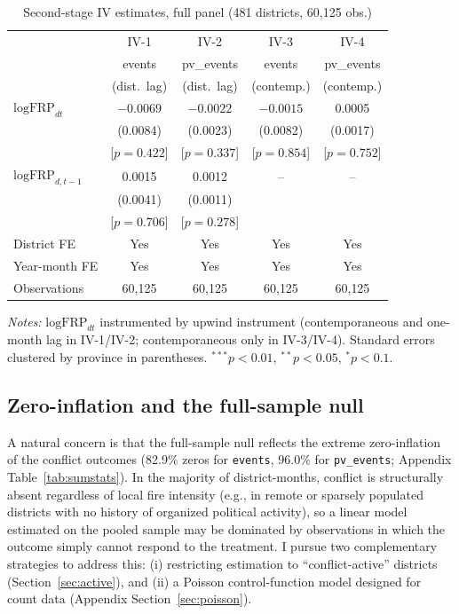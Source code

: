 \documentclass[12pt]{article}
\begin{document}
\begin{table}[H]
\centering
\caption{Second-stage IV estimates, full panel (481 districts, 60{,}125 obs.)}
\label{tab:mainiv}
\begin{tabular}{lcccc}
\toprule
 & IV-1 & IV-2 & IV-3 & IV-4 \\
 & events & pv\_events & events & pv\_events \\
 & (dist.\ lag) & (dist.\ lag) & (contemp.) & (contemp.) \\
\midrule
$\text{logFRP}_{dt}$       & $-0.0069$ & $-0.0022$ & $-0.0015$ & 0.0005  \\
                            & (0.0084) & (0.0023) & (0.0082) & (0.0017) \\
                            & [$p=0.422$] & [$p=0.337$] & [$p=0.854$] & [$p=0.752$] \\
$\text{logFRP}_{d,t-1}$    & 0.0015  & 0.0012   &  --     &  --     \\
                            & (0.0041) & (0.0011) &         &         \\
                            & [$p=0.706$] & [$p=0.278$] &      &       \\
\midrule
District FE        & Yes & Yes & Yes & Yes \\
Year-month FE      & Yes & Yes & Yes & Yes \\
Observations        & 60{,}125 & 60{,}125 & 60{,}125 & 60{,}125 \\
\bottomrule
\end{tabular}
\begin{minipage}{0.95\textwidth}
\vspace{4pt}
\footnotesize \emph{Notes:} $\text{logFRP}_{dt}$ instrumented by upwind instrument (contemporaneous and one-month lag in IV-1/IV-2; contemporaneous only in IV-3/IV-4). Standard errors clustered by province in parentheses. $^{***}p<0.01$, $^{**}p<0.05$, $^{*}p<0.1$.
\end{minipage}
\end{table}

\subsection{Zero-inflation and the full-sample null}

A natural concern is that the full-sample null reflects the extreme zero-inflation of the conflict outcomes (82.9\% zeros for \texttt{events}, 96.0\% for \texttt{pv\_events}; Appendix Table~\ref{tab:sumstats}). In the majority of district-months, conflict is structurally absent regardless of local fire intensity (e.g., in remote or sparsely populated districts with no history of organized political activity), so a linear model estimated on the pooled sample may be dominated by observations in which the outcome simply cannot respond to the treatment. I pursue two complementary strategies to address this: (i) restricting estimation to ``conflict-active'' districts (Section~\ref{sec:active}), and (ii) a Poisson control-function model designed for count data (Appendix Section~\ref{sec:poisson}).
\end{document}
